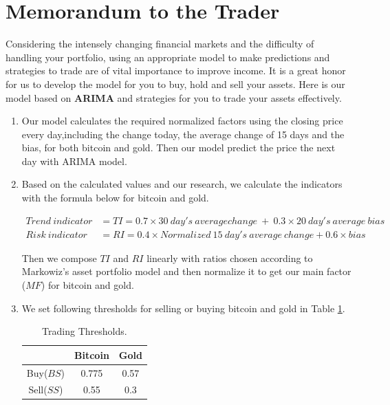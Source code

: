 \documentclass[12pt,a4paper]{article}
\newcommand{\Predictor}{ARIMA }
\begin{document}
\begin{spacing}{1.2}
\begin{thebibliography}{00}
\end{thebibliography}


\addtocounter{page}{-1}
\thispagestyle{empty}

\newpage
\addtocounter{page}{-1}
\thispagestyle{empty}

{\centering\section*{Memorandum to the Trader}}

Considering the intensely changing financial markets and the difficulty of handling your portfolio, using an appropriate model to make predictions and strategies to trade are of vital importance to improve income. It is a great honor for us to develop the model for you to buy, hold and sell your assets. Here is our model based on \textbf{\Predictor} and strategies for you to trade your assets effectively.  
	
\begin{enumerate}
	\item Our model calculates the required normalized factors using the closing price every day,including the change today, the average change of 15 days and the bias, for both bitcoin and gold. Then our model predict the price the next day with ARIMA model.
	 
	\item Based on the calculated values and our research, we calculate the indicators with the formula below for bitcoin and gold. 
	

\begin{align*}
	Trend \ indicator &= TI = 0.7 \times 30 \ day's \ average change \ + \ 0.3 \times 20 \ day's \ average \ bias \\
	Risk \ indicator &= RI = 0.4 \times Normalized \ 15 \ day's \ average \ change + 0.6 \times bias
\end{align*}
	
	Then we compose $TI$ and $RI$ linearly with ratios chosen according to Markowiz's asset portfolio model and then normalize it to get our main factor ($MF$) for bitcoin and gold. 
	
	\item We set following thresholds for selling or buying bitcoin and gold in Table \ref{table:memo_threshold}.
	
	\begin{table}[H]
		\renewcommand{\arraystretch}{1.5}
		\caption{Trading Thresholds.}
		\label{table:memo_threshold}
		\begin{center}
			{\footnotesize
				\begin{tabular}{c c c}
					\toprule
					{ } & {Bitcoin} & {Gold} \\
					\midrule
					Buy($BS$) & 0.775 & 0.57 \\
					Sell($SS$) & 0.55 & 0.3 \\
					\bottomrule
			\end{tabular}}
		\end{center}	
	\end{table}


\end{enumerate}
\end{spacing}
\end{document}
